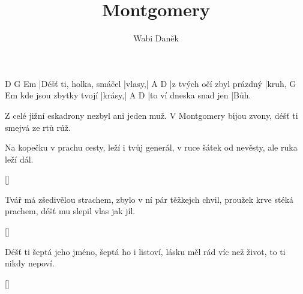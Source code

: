 \documentclass{song}
\title{Montgomery}
\author{Wabi Daněk}
\begin{document}
\strophe
D                       G      Em
|Déšť ti, holka, smáčel |vlasy,|
A\7                       D
|z tvých očí zbyl prázdný |kruh,
                      G      Em
kde jsou zbytky tvojí |krásy,|
A\7                    D
|to ví dneska snad jen |Bůh.
\endstrophe

Z celé jižní eskadrony
nezbyl ani jeden muž.
V Montgomery bijou zvony,
déšť ti smejvá ze rtů rúž.
\endstrophe

\strophe*
Na kopečku v prachu cesty,
leží i tvůj generál,
v ruce šátek od nevěsty,
ale ruka leží dál.
\endstrophe

\ref{}

\strophe*
Tvář má zšedivělou strachem,
zbylo v ní pár těžkejch chvil,
proužek krve stéká prachem,
déšť mu slepil vlas jak jíl.
\endstrophe

\ref{}

\strophe*
Déšť ti šeptá jeho jméno,
šeptá ho i listoví,
lásku měl rád víc než život,
to ti nikdy nepoví.
\endstrophe

\ref{}
\end{document}
